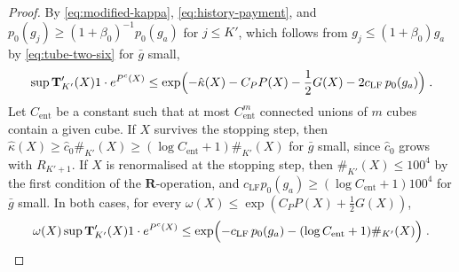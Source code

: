 \documentclass[11pt]{preprint}
\numberwithin{equation}{section}
\theoremstyle{definition}
\theoremstyle{remark}
\theoremstyle{plain}
\begin{document}
\begin{proof}
By \eqref{eq:modified-kappa}, \eqref{eq:history-payment}, and $p_0(g_{j}) \geq (1 + \beta_0)^{-1}p_0(g_a)$ for $j \leq K'$, which follows from $g_j \leq (1 + \beta_0)g_a$ by \eqref{eq:tube-two-six} for $\bar g$ small,
\begin{equation}\label{eq:component-factor}
    \sup\mathbf T'_{K'}(X)1\cdot e^{P^c(X)} \leq \exp\Bigl(-\hat\kappa(X) - C_PP(X) - \frac12G(X) - 2c_{\mathrm{LF}}\,p_0(g_a)\Bigr)\;.
\end{equation}
Let $C_{\mathrm{ent}}$ be a constant such that at most $C_{\mathrm{ent}}^m$ connected unions of $m$ cubes contain a given cube. If $X$ survives the stopping step, then $\hat\kappa(X) \geq \hat c_0\#_{K'}(X) \geq (\log C_{\mathrm{ent}} + 1)\#_{K'}(X)$ for $\bar g$ small, since $\hat c_0$ grows with $R_{K'+1}$. If $X$ is renormalised at the stopping step, then $\#_{K'}(X) \leq 100^4$ by the first condition of the $\mathbf R$-operation, and $c_{\mathrm{LF}}p_0(g_a) \geq (\log C_{\mathrm{ent}} + 1)100^4$ for $\bar g$ small. In both cases, for every $\omega(X) \leq \exp(C_PP(X) + \frac12G(X))$,
\begin{equation}\label{eq:component-weight}
    \omega(X)\sup\mathbf T'_{K'}(X)1\cdot e^{P^c(X)} \leq \exp\Bigl(-c_{\mathrm{LF}}\,p_0(g_a) - (\log C_{\mathrm{ent}} + 1)\#_{K'}(X)\Bigr)\;.
\end{equation}


\end{proof}
\end{document}
